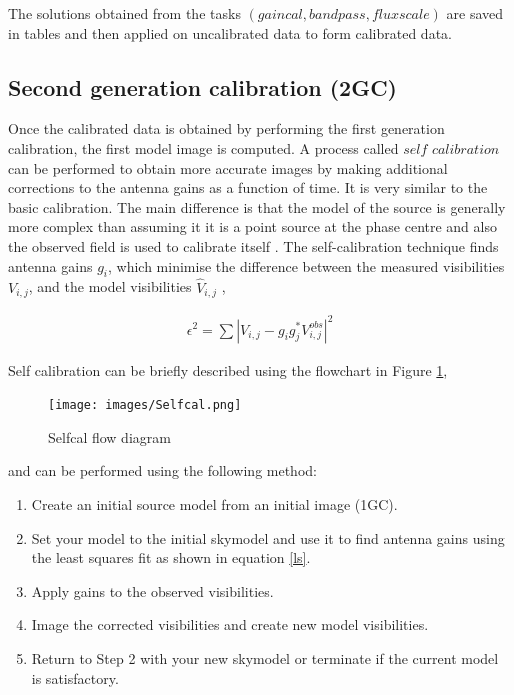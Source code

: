 The solutions obtained from the tasks $(\textit{gaincal}, \textit{bandpass}, \textit{fluxscale})$ are saved in tables and then applied on uncalibrated data 
to form calibrated data.

\subsection{Second generation calibration (2GC)}

Once the calibrated data is obtained by performing the first generation calibration, the first model image is computed. A process called $\textit{self calibration}$ can be performed to obtain more accurate images by making additional corrections to the antenna gains as a function of time. It is very similar to the basic calibration. The main difference is that the model of the source is generally more complex than assuming it it is a point source at the phase centre and also the observed field is used to calibrate itself \citep{wieringa1992investigation}. The self-calibration technique finds antenna gains $g_i$, which minimise the difference between the measured visibilities $V_{i,j}$, and the model visibilities $\hat{V}_{i,j}$ \citep{grobler2016calibration}, 

\begin{align}
\epsilon^2 = \sum |V_{i,j}-g_i g_j^* V^{obs}_{i,j}|^2
\label{ls}
\end{align}

Self calibration can be briefly described using the flowchart in Figure \ref{self},
\begin{figure}[H]
  \centering
    \texttt{[image: images/Selfcal.png]}
    \caption{Selfcal flow diagram} 
    \label{self} 
\end{figure}

and can be performed using the following method:
\begin{enumerate}
\item Create an initial source model from an initial image (1GC).
\item Set your model to the initial skymodel and use it to find antenna gains using the least squares fit as shown in equation \ref{ls}.
\item Apply gains to the observed visibilities.
\item Image the corrected visibilities and create new model visibilities. 
\item Return to Step 2 with your new skymodel or terminate if the current model is satisfactory.
\end{enumerate}
